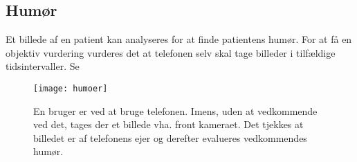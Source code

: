 \subsection{Humør}

Et billede af en patient kan analyseres for at finde patientens humør. 
For at få en objektiv vurdering vurderes det at telefonen selv skal tage billeder i tilfældige tidsintervaller. 
Se \cite{kulkarni2009facial}
\begin{figure}
\texttt{[image: humoer]}
\caption{En bruger er ved at bruge telefonen. Imens, uden at vedkommende ved det, tages der et billede vha. front kameraet. Det tjekkes at billedet er af telefonens ejer og derefter evalueres vedkommendes humør.}
\end{figure}